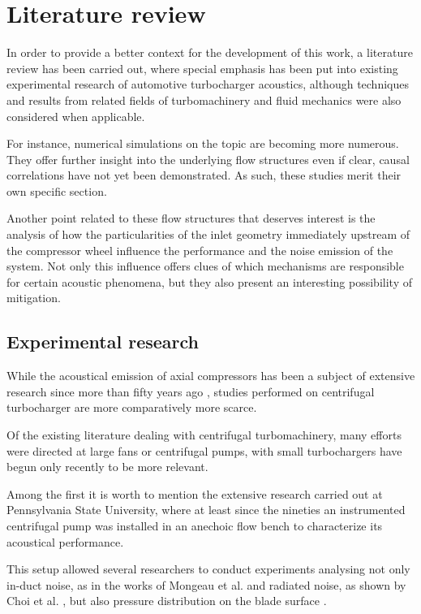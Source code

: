 \chapter{Literature review} \label{cap:liter}

\noindent In order to provide a better context for the development of this work, a literature review has been carried out, where special emphasis has been put into existing experimental research of automotive turbocharger acoustics, although techniques and results from related fields of turbomachinery and fluid mechanics were also considered when applicable.

For instance, numerical simulations on the topic are becoming more numerous. They offer further insight into the underlying flow structures even if clear, causal correlations have not yet been demonstrated. As such, these studies merit their own specific section. 

Another point related to these flow structures that deserves interest is the analysis of how the particularities of the inlet geometry immediately upstream of the compressor wheel influence the performance and the noise emission of the system. Not only this influence offers clues of which mechanisms are responsible for certain acoustic phenomena, but they also present an interesting possibility of mitigation.

\section{Experimental research}

While the acoustical emission of axial compressors has been a  subject of extensive research since more than fifty years ago \cite{nvemec1967noise,griffiths1964spectrum}, studies performed on centrifugal turbocharger are more comparatively more scarce. 

Of the existing literature dealing with centrifugal turbomachinery, many efforts were directed at large fans or centrifugal pumps, with small turbochargers have begun only recently to be more relevant.

Among the first it is worth to mention the extensive research carried out at Pennsylvania State University, where at least since the nineties \cite{mongeau1993sound} an instrumented centrifugal pump was installed in an anechoic flow bench to characterize its acoustical performance.

This setup allowed several researchers to conduct experiments analysing not only in-duct noise, as in the works of Mongeau et al. \cite{mongeau1993sound,mongeau1995method} and radiated noise, as shown by Choi et al. \cite{choi1994aerodynamic,choi2003experiments}, but also pressure distribution on the blade surface \cite{mongeau1993sound,choi1994aerodynamic}.

